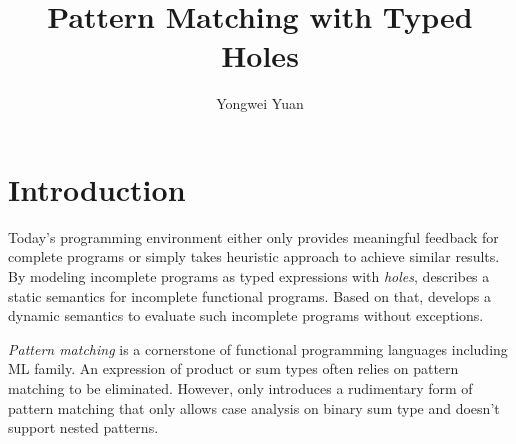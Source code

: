 \documentclass[acmsmall,screen,review,nonacm]{acmart}
\theoremstyle{slplain}
\numberwithin{thm}{section}
\begin{document}
  
\title{Pattern Matching with Typed Holes}

\author{Yongwei Yuan}


\maketitle

\section{Introduction}
\label{sec:intro}
Today's programming environment either only provides meaningful feedback for complete programs or simply takes heuristic approach to achieve similar results.
By modeling incomplete programs as typed expressions with \emph{holes}, \citet{DBLP:conf/popl/OmarVHAH17} describes a static semantics for incomplete functional programs. Based on that, \citet{DBLP:journals/pacmpl/OmarVCH19} develops a dynamic semantics to evaluate such incomplete programs without exceptions.

\emph{Pattern matching} is a cornerstone of functional programming languages including ML family. An expression of product or sum types often relies on pattern matching to be eliminated.
However, \citet{DBLP:journals/pacmpl/OmarVCH19} only introduces a rudimentary form of pattern matching that only allows case analysis on binary sum type and doesn't support nested patterns.
\end{document}
